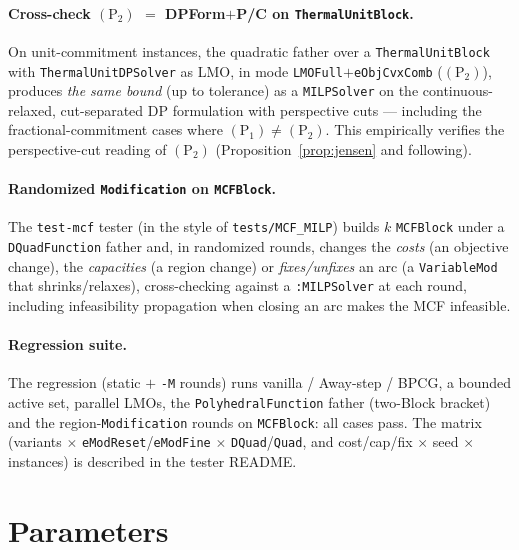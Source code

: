 \documentclass[11pt,a4paper]{article}
\newcommand{\code}[1]{\texttt{#1}}
\newcommand{\Pone}{(\mathrm{P}_1)}
\newcommand{\Ptwo}{(\mathrm{P}_2)}
\theoremstyle{plain}
\theoremstyle{remark}
\begin{document}
\paragraph{Cross-check $\Ptwo$ $=$ DPForm$+$P/C on \code{ThermalUnitBlock}.}
On unit-commitment instances, the quadratic father over a \code{ThermalUnitBlock}
with \code{ThermalUnitDPSolver} as LMO, in mode \code{LMOFull}$+$\code{eObjCvxComb}
($\Ptwo$), produces \emph{the same bound} (up to tolerance) as a \code{MILPSolver}
on the continuous-relaxed, cut-separated DP formulation with perspective cuts ---
including the fractional-commitment cases where $\Pone\neq\Ptwo$. This empirically
verifies the perspective-cut reading of $\Ptwo$ (Proposition~\ref{prop:jensen} and
following).

\paragraph{Randomized \code{Modification} on \code{MCFBlock}.}
The \code{test-mcf} tester (in the style of \code{tests/MCF\_MILP}) builds $k$
\code{MCFBlock} under a \code{DQuadFunction} father and, in randomized rounds,
changes the \emph{costs} (an objective change), the \emph{capacities} (a region
change) or \emph{fixes/unfixes} an arc (a \code{VariableMod} that shrinks/relaxes),
cross-checking against a \code{:MILPSolver} at each round, including infeasibility
propagation when closing an arc makes the MCF infeasible.

\paragraph{Regression suite.}
The regression (static $+$ \code{-M} rounds) runs vanilla / Away-step / BPCG, a
bounded active set, parallel LMOs, the \code{PolyhedralFunction} father (two-Block
bracket) and the region-\code{Modification} rounds on \code{MCFBlock}: all cases
pass. The matrix (variants $\times$ \code{eModReset}/\code{eModFine} $\times$
\code{DQuad}/\code{Quad}, and cost/cap/fix $\times$ seed $\times$ instances) is
described in the tester README.

\section{Parameters}\label{sec:params}
\end{document}
